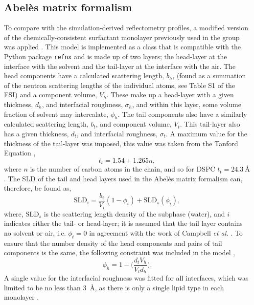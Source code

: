 \documentclass[amsmath,amssymb,twocolumn,superscriptaddress]{revtex4-1}
\begin{document}
\subsection{Abel\`{e}s matrix formalism}
To compare with the simulation-derived reflectometry profiles, a modified version of the chemically-consistent surfactant monolayer previously used in the group was applied \cite{mccluskey_bayesian_2019,mccluskey_lipids_at_airdes_2019}.
This model is implemented as a class that is compatible with the Python package \texttt{refnx} \cite{nelson_refnx_2019,nelson_refnx_2018} and is made up of two layers; the head-layer at the interface with the solvent and the tail-layer at the interface with the air.
The head components have a calculated scattering length, $b_h$, (found as a summation of the neutron scattering lengths of the individual atoms, see Table S1 of the ESI) and a component volume, $V_h$.
These make up a head-layer with a given thickness, $d_h$, and interfacial roughness, $\sigma_h$, and within this layer, some volume fraction of solvent may intercalate, $\phi_h$.
The tail components also have a similarly calculated scattering length, $b_t$, and component volume, $V_t$.
This tail-layer also has a given thickness, $d_t$, and interfacial roughness, $\sigma_t$.
A maximum value for the thickness of the tail-layer was imposed, this value was taken from the Tanford Equation \cite{tanford_hydrophobic_1980},
%
\begin{equation}
  t_t = 1.54 + 1.265n,
\end{equation}
%
where $n$ is the number of carbon atoms in the chain, and so for DSPC $t_t = \SI{24.3}{\angstrom}$.
The SLD of the tail and head layers used in the Abel\`{e}s matrix formalism can, therefore, be found as,
%
\begin{equation}
  \text{SLD}_i = \frac{b_i}{V_i}(1 - \phi_i) + \text{SLD}_s(\phi_i),
\end{equation}
%
where, $\text{SLD}_s$ is the scattering length density of the subphase (water), and $i$ indicates either the tail- or head-layer; it is assumed that the tail layer contains no solvent or air, i.e. $\phi_t = 0$ in agreement with the work of Campbell \emph{et al.} \cite{campbell_structure_2018}.
To ensure that the number density of the head components and pairs of tail components is the same, the following constraint was included in the model \cite{braun_polymers_2017},
%
\begin{equation}
  \phi_h = 1 - \bigg(\frac{d_tV_h}{V_td_h}\bigg).
\end{equation}
%
A single value for the interfacial roughness was fitted for all interfaces, which was limited to be no less than \SI{3}{\angstrom}, as there is only a single lipid type in each monolayer \cite{campbell_structure_2018}.
\end{document}
